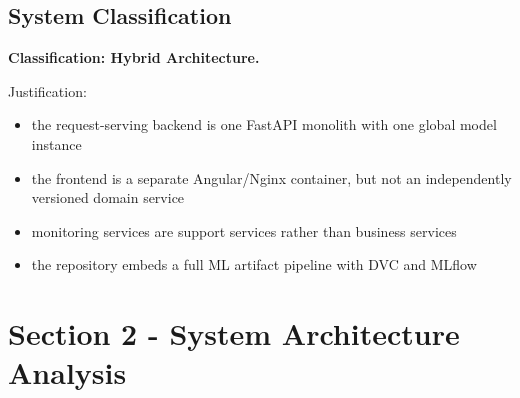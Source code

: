 \subsection{System Classification}
\textbf{Classification: Hybrid Architecture.}

Justification:
\begin{itemize}[leftmargin=1.2em]
  \item the request-serving backend is one FastAPI monolith with one global model instance
  \item the frontend is a separate Angular/Nginx container, but not an independently versioned domain service
  \item monitoring services are support services rather than business services
  \item the repository embeds a full ML artifact pipeline with DVC and MLflow
\end{itemize}

\section{Section 2 - System Architecture Analysis}
